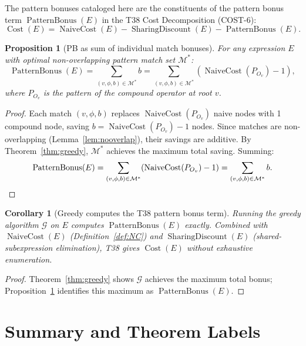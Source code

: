 \documentclass[12pt,a4paper]{article}
\newtheorem{corollary}[theorem]{Corollary}
\newtheorem{proposition}[theorem]{Proposition}
\theoremstyle{definition}
\newcommand{\NC}{\operatorname{NaiveCost}}
\newcommand{\Cost}{\operatorname{Cost}}
\newcommand{\PB}{\operatorname{PatternBonus}}
\newcommand{\SD}{\operatorname{SharingDiscount}}
\begin{document}
The pattern bonuses cataloged here are the constituents of the pattern
bonus term $\PB(E)$ in the T38 Cost Decomposition (COST-6):
\[
  \Cost(E) = \NC(E) - \SD(E) - \PB(E).
\]

\begin{proposition}[PB as sum of individual match bonuses]
\label{prop:PBsum}
For any expression $E$ with optimal non-overlapping pattern match set
$\mathcal{M}^*$:
\[
  \PB(E) = \sum_{(v, \phi, b) \in \mathcal{M}^*} b
         = \sum_{(v, \phi, b) \in \mathcal{M}^*} (\NC(P_{O_v}) - 1),
\]
where $P_{O_v}$ is the pattern of the compound operator at root $v$.
\end{proposition}

\begin{proof}
Each match $(v, \phi, b)$ replaces $\NC(P_{O_v})$ naive nodes with 1
compound node, saving $b = \NC(P_{O_v}) - 1$ nodes.  Since matches are
non-overlapping (Lemma~\ref{lem:nooverlap}), their savings are additive.
By Theorem~\ref{thm:greedy}, $\mathcal{M}^*$ achieves the maximum total
saving.  Summing:
\[
  \PB(E) = \sum_{(v,\phi,b)\in\mathcal{M}^*} (\NC(P_{O_v}) - 1)
         = \sum_{(v,\phi,b)\in\mathcal{M}^*} b. \qedhere
\]
\end{proof}

\begin{corollary}[Greedy computes the T38 pattern bonus term]
\label{cor:greedyT38}
Running the greedy algorithm $\mathcal{G}$ on $E$ computes
$\PB(E)$ exactly.  Combined with $\NC(E)$ (Definition~\ref{def:NC})
and $\SD(E)$ (shared-subexpression elimination), T38 gives
$\Cost(E)$ without exhaustive enumeration.
\end{corollary}

\begin{proof}
Theorem~\ref{thm:greedy} shows $\mathcal{G}$ achieves the maximum
total bonus; Proposition~\ref{prop:PBsum} identifies this maximum as
$\PB(E)$.
\end{proof}

\section{Summary and Theorem Labels}
\label{sec:summary}
\end{document}
